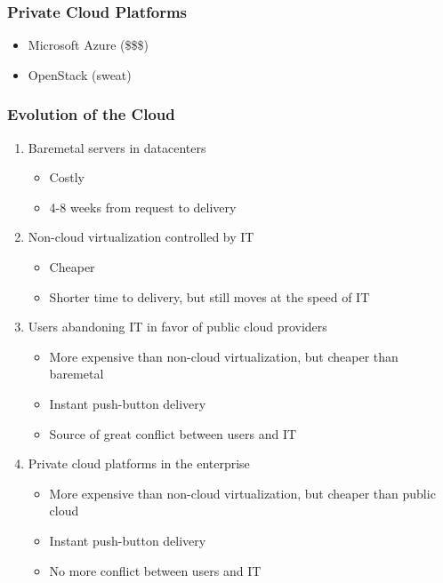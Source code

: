 \documentclass[helvetica,english,utf8,notitle,nologo]{beamer}
\begin{document}
\begin{frame}
  \frametitle{Private Cloud Platforms}
  \begin{itemize}
  \item Microsoft Azure (\$\$\$)
  \item OpenStack (sweat)
  \end{itemize}
\end{frame}

\begin{frame}
  \frametitle{Evolution of the Cloud}
  \begin{enumerate}
  \item Baremetal servers in datacenters
    \begin{itemize}
    \item Costly
    \item 4-8 weeks from request to delivery
    \end{itemize}
  \item Non-cloud virtualization controlled by IT
    \begin{itemize}
    \item Cheaper
    \item Shorter time to delivery, but still moves at the speed of IT
    \end{itemize}
  \item Users abandoning IT in favor of public cloud providers
    \begin{itemize}
    \item More expensive than non-cloud virtualization, but cheaper
      than baremetal
    \item Instant push-button delivery
    \item Source of great conflict between users and IT
    \end{itemize}
  \item Private cloud platforms in the enterprise
    \begin{itemize}
    \item More expensive than non-cloud virtualization, but cheaper
      than public cloud
    \item Instant push-button delivery
    \item No more conflict between users and IT
    \end{itemize}
  \end{enumerate}
\end{frame}
\end{document}
